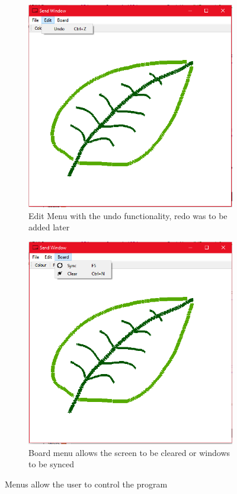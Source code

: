 \documentclass[10pt]{article}
\newcommand{\figsquish}{\vspace{-5mm}} %
\begin{document}
\begin{multicols*}{2}
\begin{figure}[H]
\begin{subfigure}[t]{0.32\columnwidth}
		\includegraphics[width=\columnwidth]{./edit.png}
		\caption{Edit Menu with the undo functionality, redo was to be added later}
		\label{fig:edit}
	\end{subfigure}
	\hfill
	\begin{subfigure}[t]{0.32\columnwidth}

		\includegraphics[width=\columnwidth]{./board.png}
		\caption{Board menu allows the screen to be cleared or windows to be synced}
		\label{fig:board}
	\end{subfigure}
	\caption{Menus allow the user to control the program}
	\label{fig:menus}
\end{figure}
\figsquish


\end{multicols*}
\end{document}
